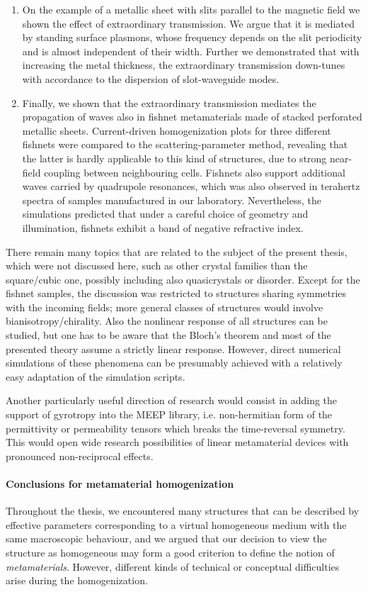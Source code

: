 \begin{enumerate}
{} 
\item{On the example of a metallic sheet with slits parallel to the magnetic field we shown the effect of extraordinary transmission. We argue that it is mediated by standing surface plasmons, whose frequency depends on the slit periodicity and is almost independent of their width. Further we demonstrated that with increasing the metal thickness, the extraordinary transmission down-tunes with accordance to the dispersion of slot-waveguide modes.
} 
\item{Finally, we shown that the extraordinary transmission mediates the propagation of waves also in fishnet metamaterials made of stacked perforated metallic sheets. Current-driven homogenization plots for three different fishnets were compared to the scattering-parameter method, revealing that the latter is hardly applicable to this kind of structures, due to strong near-field coupling between neighbouring cells. Fishnets also support additional waves carried by quadrupole resonances, which was also observed in terahertz spectra of samples manufactured in our laboratory. Nevertheless, the simulations predicted that under a careful choice of geometry and illumination, fishnets exhibit a band of negative refractive index. 
}
\end{enumerate}
There remain many topics that are related to the subject of the present thesis, which were not discussed here, such as other crystal families than the square/cubic one, possibly including also quasicrystals or disorder. Except for the fishnet samples, the discussion was restricted to structures sharing symmetries with the incoming fields; more general classes of structures would involve bianisotropy/chirality. Also the nonlinear response of all structures can be studied, but one has to be aware that the Bloch's theorem and most of the presented theory assume a strictly linear response. However, direct numerical simulations of these phenomena can be presumably  achieved with a relatively easy adaptation of the simulation scripts.

Another particularly useful direction of research would consist in adding the support of gyrotropy into the MEEP library, i.e. non-hermitian form of the permittivity or permeability tensors which breaks the time-reversal symmetry. This would open wide research possibilities of linear metamaterial devices with pronounced non-reciprocal effects.

\paragraph{Conclusions for metamaterial homogenization}
Throughout the thesis, we encountered many structures that can be described by effective parameters corresponding to a virtual homogeneous medium with the same macroscopic behaviour, and we argued that our decision to view the structure as homogeneous may form a good criterion to define the notion of \textit{metamaterials}. However, different kinds of technical or conceptual difficulties arise during the homogenization.

